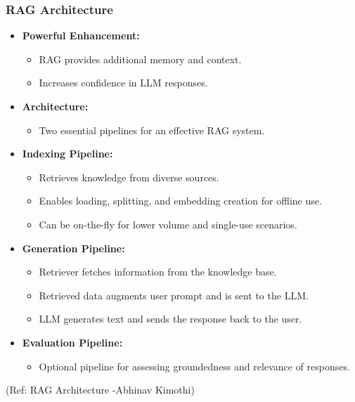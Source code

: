 \begin{frame}[fragile]\frametitle{RAG Architecture}

\begin{itemize}
  \item \textbf{Powerful Enhancement:}
    \begin{itemize}
      \item RAG provides additional memory and context.
      \item Increases confidence in LLM responses.
    \end{itemize}

  \item \textbf{Architecture:}
    \begin{itemize}
      \item Two essential pipelines for an effective RAG system.
    \end{itemize}
  
  \item \textbf{Indexing Pipeline:}
    \begin{itemize}
      \item Retrieves knowledge from diverse sources.
      \item Enables loading, splitting, and embedding creation for offline use.
      \item Can be on-the-fly for lower volume and single-use scenarios.
    \end{itemize}

  \item \textbf{Generation Pipeline:}
    \begin{itemize}
      \item Retriever fetches information from the knowledge base.
      \item Retrieved data augments user prompt and is sent to the LLM.
      \item LLM generates text and sends the response back to the user.
    \end{itemize}

  \item \textbf{Evaluation Pipeline:}
    \begin{itemize}
      \item Optional pipeline for assessing groundedness and relevance of responses.
    \end{itemize}
\end{itemize}

{\tiny (Ref: RAG Architecture -Abhinav  Kimothi)}

\end{frame}

